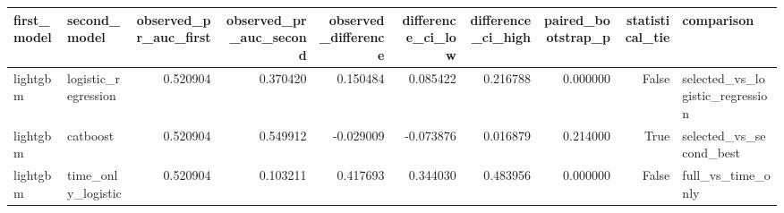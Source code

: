 \begin{tabular}{llrrrrrrrl}
\toprule
first\_model & second\_model & observed\_pr\_auc\_first & observed\_pr\_auc\_second & observed\_difference & difference\_ci\_low & difference\_ci\_high & paired\_bootstrap\_p & statistical\_tie & comparison \\
\midrule
lightgbm & logistic\_regression & 0.520904 & 0.370420 & 0.150484 & 0.085422 & 0.216788 & 0.000000 & False & selected\_vs\_logistic\_regression \\
lightgbm & catboost & 0.520904 & 0.549912 & -0.029009 & -0.073876 & 0.016879 & 0.214000 & True & selected\_vs\_second\_best \\
lightgbm & time\_only\_logistic & 0.520904 & 0.103211 & 0.417693 & 0.344030 & 0.483956 & 0.000000 & False & full\_vs\_time\_only \\
\bottomrule
\end{tabular}
